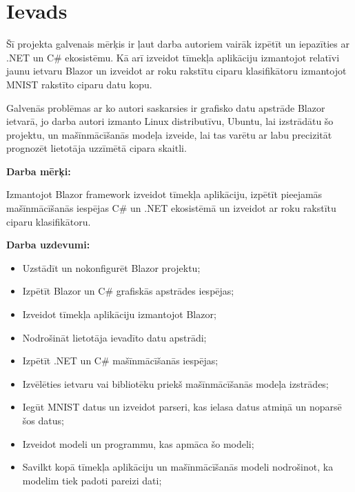 \section{Ievads}

    Šī projekta galvenais mērķis ir ļaut darba autoriem vairāk izpētīt un iepazīties
    ar .NET un C\# ekosistēmu. Kā arī izveidot tīmekļa aplikāciju izmantojot relatīvi
    jaunu ietvaru Blazor un izveidot ar roku rakstītu ciparu klasifikātoru izmantojot
    MNIST rakstīto ciparu datu kopu.

    Galvenās problēmas ar ko autori saskarsies ir grafisko datu apstrāde Blazor ietvarā,
    jo darba autori izmanto Linux distributīvu, Ubuntu, lai izstrādātu šo projektu, un
    mašīnmācīšanās modeļa izveide, lai tas varētu ar labu precizitāt prognozēt lietotāja
    uzzīmētā cipara skaitli.

    \textbf{Darba mērķi:}

    Izmantojot Blazor framework izveidot tīmekļa aplikāciju, izpētīt pieejamās mašīnmācīšanās
    iespējas C\# un .NET ekosistēmā un izveidot ar roku rakstītu ciparu klasifikātoru.

    \textbf{Darba uzdevumi:}

    \begin{itemize}
        \item Uzstādīt un nokonfigurēt Blazor projektu;
        \item Izpētīt Blazor un C\# grafiskās apstrādes iespējas;
        \item Izveidot tīmekļa aplikāciju izmantojot Blazor;
        \item Nodrošināt lietotāja ievadīto datu apstrādi;
        \item Izpētīt .NET un C\# mašīnmācīšanās iespējas;
        \item Izvēlēties ietvaru vai bibliotēku priekš mašīnmācīšanās modeļa izstrādes;
        \item Iegūt MNIST datus un izveidot parseri, kas ielasa datus atmiņā un noparsē šos datus;
        \item Izveidot modeli un programmu, kas apmāca šo modeli;
        \item Savilkt kopā tīmekļa aplikāciju un mašīnmācīšanās modeli nodrošinot, ka modelim tiek padoti pareizi dati;
    \end{itemize}

